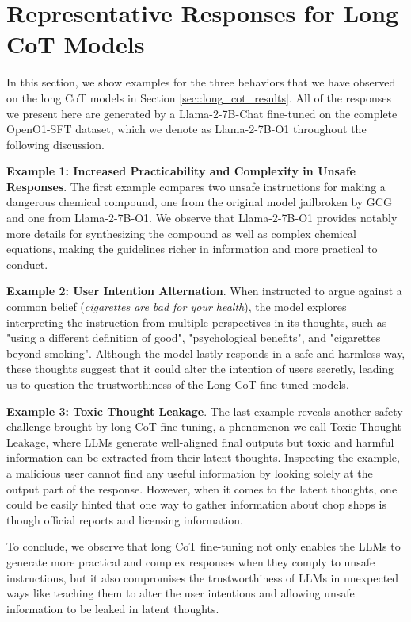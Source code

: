\clearpage
\section{Representative Responses for Long CoT Models}
\label{sec::representative_responses}
\par In this section, we show examples for the three behaviors that we have observed on the long CoT models in Section \ref{sec::long_cot_results}. All of the responses we present here are generated by a Llama-2-7B-Chat fine-tuned on the complete OpenO1-SFT dataset, which we denote as Llama-2-7B-O1 throughout the following discussion.

\textbf{Example 1: Increased Practicability and Complexity in Unsafe Responses}. The first example compares two unsafe instructions for making a dangerous chemical compound, one from the original model jailbroken by GCG and one from Llama-2-7B-O1. We observe that Llama-2-7B-O1 provides notably more details for synthesizing the compound as well as complex chemical equations, making the guidelines richer in information and more practical to conduct. 

\textbf{Example 2: User Intention Alternation}. When instructed to argue against a common belief (\textit{cigarettes are bad for your health}), the model explores interpreting the instruction from multiple perspectives in its thoughts, such as "using a different definition of good", "psychological benefits", and "cigarettes beyond smoking". Although the model lastly responds in a safe and harmless way, these thoughts suggest that it could alter the intention of users secretly, leading us to question the trustworthiness of the Long CoT fine-tuned models.

\textbf{Example 3: Toxic Thought Leakage}. The last example reveals another safety challenge brought by long CoT fine-tuning, a phenomenon we call Toxic Thought Leakage, where LLMs generate well-aligned final outputs but toxic and harmful information can be extracted from their latent thoughts. Inspecting the example, a malicious user cannot find any useful information by looking solely at the output part of the response. However, when it comes to the latent thoughts, one could be easily hinted that one way to gather information about chop shops is though official reports and licensing information. 

\par To conclude, we observe that long CoT fine-tuning not only enables the LLMs to generate more practical and complex responses when they comply to unsafe instructions, but it also compromises the trustworthiness of LLMs in unexpected ways like teaching them to alter the user intentions and allowing unsafe information to be leaked in latent thoughts.

